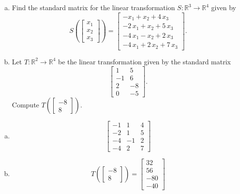 
\begin{exerciseStatement}

\begin{enumerate}[(a)]
\item Find the standard matrix for the linear transformation \(S:\mathbb{R}^ 3  \to \mathbb{R}^ 4 \) given by \[S\left(  \left[\begin{array}{c}
x_{1} \\
x_{2} \\
x_{3}
\end{array}\right]  \right) =  \left[\begin{array}{c}
-x_{1} + x_{2} + 4 \, x_{3} \\
-2 \, x_{1} + x_{2} + 5 \, x_{3} \\
-4 \, x_{1} - x_{2} + 2 \, x_{3} \\
-4 \, x_{1} + 2 \, x_{2} + 7 \, x_{3}
\end{array}\right] .\]
\item Let \(T:\mathbb{R}^ 2  \to \mathbb{R}^ 4 \) be the linear transformation given by the standard matrix \[ \left[\begin{array}{cc}
1 & 5 \\
-1 & 6 \\
2 & -8 \\
0 & -5
\end{array}\right] .\] Compute \(T\left( \left[\begin{array}{c}
-8 \\
8
\end{array}\right]  \right)\). 
\end{enumerate}
    
\end{exerciseStatement}
    
\begin{exerciseAnswer} 

\begin{enumerate}[(a)]
\item \[ \left[\begin{array}{ccc}
-1 & 1 & 4 \\
-2 & 1 & 5 \\
-4 & -1 & 2 \\
-4 & 2 & 7
\end{array}\right] \]
\item \[T\left( \left[\begin{array}{c}
-8 \\
8
\end{array}\right]  \right)= \left[\begin{array}{c}
32 \\
56 \\
-80 \\
-40
\end{array}\right] \]
\end{enumerate}
    
\end{exerciseAnswer}
    
